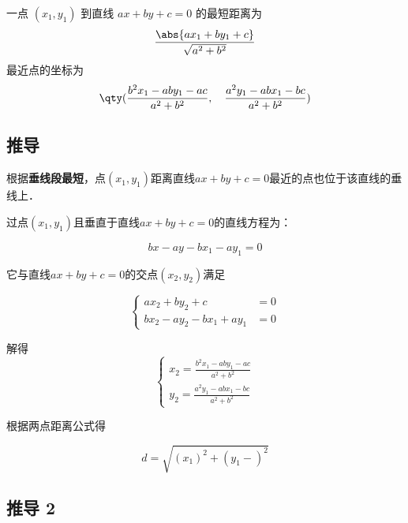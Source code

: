 
\begin{issues}
\issueDraft
\end{issues}

一点 $(x_1,y_1)$ 到直线 $ax + by + c = 0$ 的最短距离为
\begin{equation}
\frac{\abs{ax_1 + by_1 + c}}{\sqrt{a^2 + b^2}}
\end{equation}
最近点的坐标为
\begin{equation}
\qty(
\frac{b^2x_1 - aby_1 - ac}{a^2 + b^2}, \quad
\frac{a^2y_1 - abx_1 - bc}{a^2 + b^2})
\end{equation}

\subsection{推导}

根据\textbf{垂线段最短}，点$(x_1,y_1)$距离直线$ax+by+c=0$最近的点也位于该直线的垂线上．

过点$(x_1,y_1)$且垂直于直线$ax+by+c=0$的直线方程为：

\begin{equation}
bx-ay-bx_1-ay_1=0
\end{equation}

它与直线$ax+by+c=0$的交点$(x_2,y_2)$满足

\begin{equation}
\left\lbrace
\begin{aligned}
ax_2+by_2+c&=0\\
bx_2-ay_2-bx_1+ay_1&=0
\end{aligned}
\right.
\end{equation}

解得
\begin{equation}
\left\lbrace
\begin{aligned}
x_2=\frac{b^2x_1 - aby_1 - ac}{a^2 + b^2}\\
y_2=\frac{a^2y_1 - abx_1 - bc}{a^2 + b^2}
\end{aligned}
\right.
\end{equation}

根据两点距离公式得

\begin{equation}
d=\sqrt{(x_1)^2+(y_1-)^2}
\end{equation}


\subsection{推导 2}


